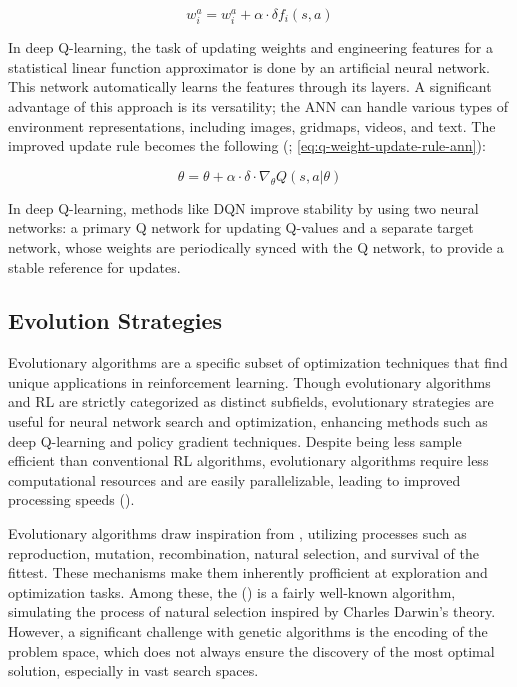 \begin{equation}
    w_i^a = w_i^a + \alpha \cdot \delta f_i(s, a)
    \label{eq:q-weight-update-rule}
\end{equation}

\noindent In deep Q-learning, the task of updating weights and engineering features for a statistical linear function approximator is done by an artificial neural network. This network automatically learns the features through its layers. A significant advantage of this approach is its versatility; the ANN can handle various types of environment representations, including images, gridmaps, videos, and text. The improved update rule becomes the following (\textcolor{deepblue}{\cite{valuemethods}; \autoref{eq:q-weight-update-rule-ann}}):

\begin{equation}
    \theta = \theta + \alpha \cdot \delta \cdot \nabla_{\theta} Q(s, a | \theta)
    \label{eq:q-weight-update-rule-ann}
\end{equation}

\noindent In deep Q-learning, methods like DQN improve stability by using two neural networks: a primary Q network for updating Q-values and a separate target network, whose weights are periodically synced with the Q network, to provide a stable reference for updates.

\subsection{Evolution Strategies}

\noindent Evolutionary algorithms are a specific subset of optimization techniques that find unique applications in reinforcement learning. Though evolutionary algorithms and RL are strictly categorized as distinct subfields, evolutionary strategies are useful for neural network search and optimization, enhancing methods such as deep Q-learning and policy gradient techniques. Despite being less sample efficient than conventional RL algorithms, evolutionary algorithms require less computational resources and are easily parallelizable, leading to improved processing speeds (\textcolor{deepblue}{\cite{Yanes2021}}). 

\bigskip

\noindent Evolutionary algorithms draw inspiration from , utilizing processes such as reproduction, mutation, recombination, natural selection, and survival of the fittest. These mechanisms make them inherently profficient at exploration and optimization tasks. Among these, the  (\textcolor{deepblue}{\cite{1975Holland}}) is a fairly well-known algorithm, simulating the process of natural selection inspired by Charles Darwin’s theory. However, a significant challenge with genetic algorithms is the encoding of the problem space, which does not always ensure the discovery of the most optimal solution, especially in vast search spaces.


